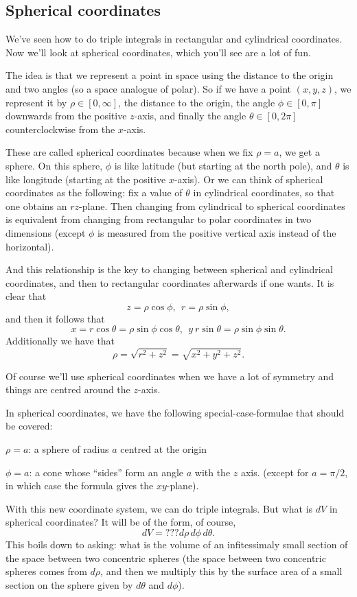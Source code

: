 \subsection{Spherical coordinates}

We've seen how to do triple integrals in rectangular and cylindrical coordinates. Now we'll look at spherical coordinates, which you'll see are a lot of fun. 

The idea is that we represent a point in space using the distance to the origin and two angles (so a space analogue of polar). So if we have a point $(x,y,z)$, we represent it by $\rho \in [0,\infty]$, the distance to the origin, the angle $\phi \in [0,\pi]$ downwards from the positive $z$-axis, and finally the angle $\theta \in [0,2\pi]$ counterclockwise from the $x$-axis. 

These are called spherical coordinates because when we fix $\rho = a$, we get a sphere. On this sphere, $\phi$ is like latitude (but starting at the north pole), and $\theta$ is like longitude (starting at the positive $x$-axis). Or we can think of spherical coordinates as the following: fix a value of $\theta$ in cylindrical coordinates, so that one obtains an $rz$-plane. Then changing from cylindrical to spherical coordinates is equivalent from changing from rectangular to polar coordinates in two dimensions (except $\phi$ is measured from the positive vertical axis instead of the horizontal). 

And this relationship is the key to changing between spherical and cylindrical coordinates, and then to rectangular coordinates afterwards if one wants. It is clear that 
\[ z = \rho \cos \phi,\ \ r = \rho \sin \phi, \]
and then it follows that
\[ x = r\cos \theta = \rho \sin\phi \cos \theta,\ \ y \ r \sin\theta = \rho \sin \phi \sin \theta. \]
Additionally we have that 
\[ \rho = \sqrt{r^2+z^2}=\sqrt{x^2+y^2+z^2}. \]

Of course we'll use spherical coordinates when we have a lot of symmetry and things are centred around the $z$-axis. 

In spherical coordinates, we have the following special-case-formulae that should be covered:
\bit
\item $\rho=a$: a sphere of radius $a$ centred at the origin
\item $\phi=a$: a cone whose ``sides'' form an angle $a$ with the $z$ axis. (except for $a=\pi/2$, in which case the formula gives the $xy$-plane).
\eit

With this new coordinate system, we can do triple integrals. But what is $dV$ in spherical coordinates? It will be of the form, of course,
\[ dV = ??? d\rho\, d\phi\, d\theta. \]
This boils down to asking: what is the volume of an infitessimaly small section of the space between two concentric spheres (the space between two concentric spheres comes from $d\rho$, and then we multiply this by the surface area of a small section on the sphere given by $d\theta$ and $d\phi$). 

